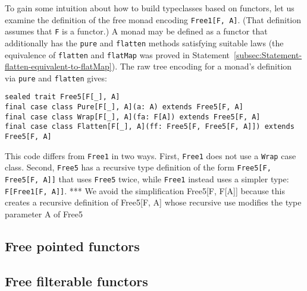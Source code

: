 To gain some intuition about how to build typeclasses based on functors,
let us examine the definition of the free monad encoding \lstinline!Free1[F, A]!.
(That definition assumes that \lstinline!F!
is a functor.) A monad may be defined as a functor that additionally
has the \lstinline!pure!
and \lstinline!flatten!
methods satisfying suitable laws (the equivalence of \lstinline!flatten!
and \lstinline!flatMap!
was proved in Statement~\ref{subsec:Statement-flatten-equivalent-to-flatMap}).
The raw tree encoding for a monad\textsf{'}s definition via \lstinline!pure!
and \lstinline!flatten!
gives:
\begin{lstlisting}
sealed trait Free5[F[_], A]
final case class Pure[F[_], A](a: A) extends Free5[F, A]
final case class Wrap[F[_], A](fa: F[A]) extends Free5[F, A]
final case class Flatten[F[_], A](ff: Free5[F, Free5[F, A]]) extends Free5[F, A]
\end{lstlisting}
This code differs from \lstinline!Free1!
in two ways. First, \lstinline!Free1!
does not use a \lstinline!Wrap!
case class. Second, \lstinline!Free5!
has a recursive type definition of the form \lstinline!Free5[F, Free5[F, A]]!
that uses \lstinline!Free5!
twice, while \lstinline!Free1!
instead uses a simpler type: \lstinline!F[Free1[F, A]]!.
{*}{*}{*} We avoid the simplification Free5{[}F, F{[}A{]}{]} because
this creates a recursive definition of Free5{[}F, A{]} whose recursive
use modifies the type parameter A of Free5

\subsection{Free pointed functors}

\subsection{Free filterable functors}

